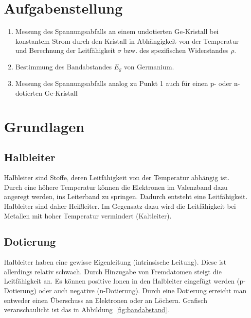 \documentclass{article}
\begin{document}
\parindent0cm




\tableofcontents
\newpage

\pagestyle{fancy}

\section{Aufgabenstellung}

\begin{enumerate}
\item Messung des Spannungsabfalls an einem undotierten Ge-Kristall bei
konstantem Strom durch den Kristall in Abhängigkeit von der Temperatur und
Berechnung der Leitfähigkeit $\sigma$ bzw. des spezifischen Widerstandes $\rho$.
\item Bestimmung des Bandabstandes $E_g$ von Germanium.
\item Messung des Spannungsabfalls analog zu Punkt 1 auch für einen p- oder n- dotierten Ge-Kristall
\end{enumerate}



\section{Grundlagen}



\subsection{Halbleiter}
Halbleiter sind Stoffe, deren Leitfähigkeit von der Temperatur abhängig ist. Durch eine höhere Temperatur können die Elektronen im Valenzband dazu angeregt werden, ins Leiterband zu springen. Dadurch entsteht eine Leitfähigkeit. Halbleiter sind daher Heißleiter. Im Gegensatz dazu wird die Leitfähigkeit bei Metallen mit hoher Temperatur vermindert (Kaltleiter).

\subsection{Dotierung}
Halbleiter haben eine gewisse Eigenleitung (intrinsische Leitung). Diese ist allerdings relativ schwach. Durch Hinzugabe von Fremdatomen steigt die Leitfähigkeit an. Es können positive Ionen in den Halbleiter eingefügt werden (p-Dotierung) oder auch negative (n-Dotierung). Durch eine Dotierung erreicht man entweder einen Überschuss an Elektronen oder an Löchern. Grafisch veranschaulicht ist das in Abbildung~\ref{fig:bandabstand}.
\end{document}

